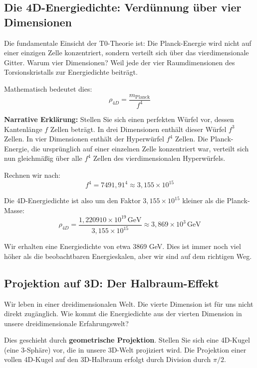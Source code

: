	\subsection{Die 4D-Energiedichte: Verdünnung über vier Dimensionen}
	
	Die fundamentale Einsicht der T0-Theorie ist: Die Planck-Energie wird nicht auf einer einzigen Zelle konzentriert, sondern verteilt sich über das vierdimensionale Gitter. Warum vier Dimensionen? Weil jede der vier Raumdimensionen des Torsionskristalls zur Energiedichte beiträgt.
	
	Mathematisch bedeutet dies:
	\begin{equation}
		\boxed{\rho_{4D} = \frac{m_{\text{Planck}}}{f^4}}
	\end{equation}
	
	\textbf{Narrative Erklärung:} Stellen Sie sich einen perfekten Würfel vor, dessen Kantenlänge \(f\) Zellen beträgt. In drei Dimensionen enthält dieser Würfel \(f^3\) Zellen. In vier Dimensionen enthält der Hyperwürfel \(f^4\) Zellen. Die Planck-Energie, die ursprünglich auf einer einzelnen Zelle konzentriert war, verteilt sich nun gleichmäßig über alle \(f^4\) Zellen des vierdimensionalen Hyperwürfels.
	
	Rechnen wir nach:
	\begin{equation}
		f^4 = 7491{,}91^4 \approx 3{,}155 \times 10^{15}
	\end{equation}
	
	Die 4D-Energiedichte ist also um den Faktor \(3{,}155 \times 10^{15}\) kleiner als die Planck-Masse:
	\begin{equation}
		\rho_{4D} = \frac{1{,}220910 \times 10^{19}\,\text{GeV}}{3{,}155 \times 10^{15}} \approx 3{,}869 \times 10^{3}\,\text{GeV}
	\end{equation}
	
	Wir erhalten eine Energiedichte von etwa 3869 GeV. Dies ist immer noch viel höher als die beobachtbaren Energieskalen, aber wir sind auf dem richtigen Weg.
	
	\subsection{Projektion auf 3D: Der Halbraum-Effekt}
	
	Wir leben in einer dreidimensionalen Welt. Die vierte Dimension ist für uns nicht direkt zugänglich. Wie kommt die Energiedichte aus der vierten Dimension in unsere dreidimensionale Erfahrungswelt?
	
	Dies geschieht durch \textbf{geometrische Projektion}. Stellen Sie sich eine 4D-Kugel (eine 3-Sphäre) vor, die in unsere 3D-Welt projiziert wird. Die Projektion einer vollen 4D-Kugel auf den 3D-Halbraum erfolgt durch Division durch \(\pi/2\).
	
